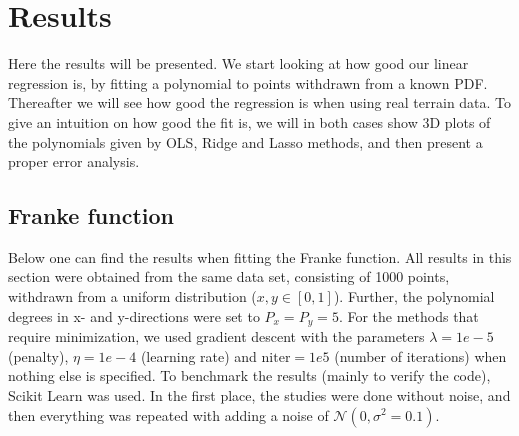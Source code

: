 \section{Results} \label{sec:results}
Here the results will be presented. We start looking at how good our linear regression is, by fitting a polynomial to points withdrawn from a known PDF. Thereafter we will see how good the regression is when using real terrain data. To give an intuition on how good the fit is, we will in both cases show 3D plots of the polynomials given by OLS, Ridge and Lasso methods, and then present a proper error analysis. 

\subsection{Franke function}
Below one can find the results when fitting the Franke function. All results in this section were obtained from the same data set, consisting of 1000 points, withdrawn from a uniform distribution ($x,y\in[0,1]$). Further, the polynomial degrees in x- and y-directions were set to $P_x=P_y=5$. For the methods that require minimization, we used gradient descent with the parameters $\lambda=1e-5$ (penalty), $\eta=1e-4$ (learning rate) and $\text{niter}=1e5$ (number of iterations) when nothing else is specified. To benchmark the results (mainly to verify the code), Scikit Learn was used. In the first place, the studies were done without noise, and then everything was repeated with adding a noise of $\mathcal{N}(0, \sigma^2=0.1)$.

